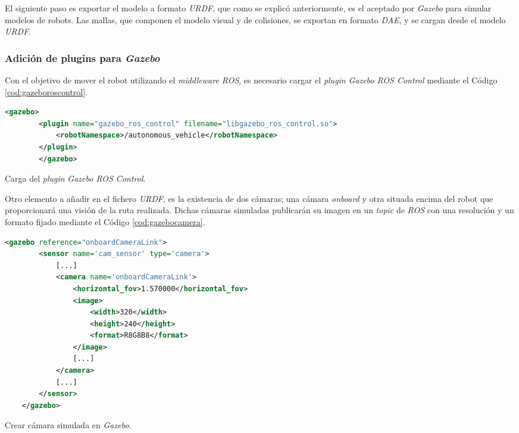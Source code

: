 El siguiente paso es exportar el modelo a formato \textit{URDF}, que como se explicó anteriormente, es el aceptado por \textit{Gazebo} para simular modelos de robots. Las mallas, que componen el modelo visual y de colisiones, se exportan en formato \textit{DAE}, y se cargan desde el modelo \textit{URDF}.\\

\subsubsection{Adición de plugins para \textit{Gazebo}}

Con el objetivo de mover el robot utilizando el \textit{middleware ROS}, es necesario cargar el \textit{plugin} \textit{Gazebo ROS Control} mediante el Código \ref{cod:gazeboroscontrol}.\\

\begin{code}[h]
	\begin{lstlisting}[language=XML]
		<gazebo>
		<plugin name="gazebo_ros_control" filename="libgazebo_ros_control.so">
			<robotNamespace>/autonomous_vehicle</robotNamespace>
		</plugin>
		</gazebo>
	\end{lstlisting}
	\caption[Carga del \textit{plugin} \textit{Gazebo ROS Control}.]{Carga del \textit{plugin} \textit{Gazebo ROS Control}.}
	\label{cod:gazeboroscontrol}
\end{code}

Otro elemento a añadir en el fichero \textit{URDF}, es la existencia de dos cámaras; una cámara \textit{onboard} y otra situada encima del robot que proporcionará una visión de la ruta realizada. Dichas cámaras simuladas publicarán su imagen en un \textit{topic} de \textit{ROS} con una resolución y un formato fijado mediante el Código \ref{cod:gazebocamera}.\\

\begin{code}[h]
	\begin{lstlisting}[language=XML]
	<gazebo reference="onboardCameraLink">
		<sensor name='cam_sensor' type='camera'>
			[...]
			<camera name='onboardCameraLink'>
				<horizontal_fov>1.570000</horizontal_fov>
				<image>
					<width>320</width>
					<height>240</height>
					<format>R8G8B8</format>
				</image>
				[...]
			</camera>
			[...]
		</sensor>
	</gazebo>
	\end{lstlisting}
	\caption[Crear cámara simulada en \textit{Gazebo}.]{Crear cámara simulada en \textit{Gazebo}.}
	\label{cod:gazebocamera}
\end{code}

